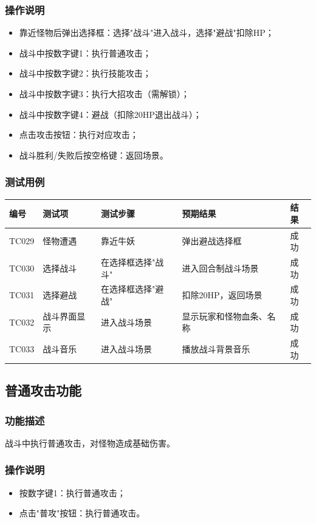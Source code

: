 \documentclass[a4paper,12pt]{article}
\begin{document}
\subsubsection{操作说明}
\begin{itemize}[leftmargin=2em]
    \item 靠近怪物后弹出选择框：选择"战斗"进入战斗，选择"避战"扣除HP；
    \item 战斗中按数字键1：执行普通攻击；
    \item 战斗中按数字键2：执行技能攻击；
    \item 战斗中按数字键3：执行大招攻击（需解锁）；
    \item 战斗中按数字键4：避战（扣除20HP退出战斗）；
    \item 点击攻击按钮：执行对应攻击；
    \item 战斗胜利/失败后按空格键：返回场景。
\end{itemize}

\subsubsection{测试用例}
\begin{longtable}{p{1.2cm} p{2.8cm} p{4cm} p{3.5cm} p{1.5cm}}
\toprule
\textbf{编号} & \textbf{测试项} & \textbf{测试步骤} & \textbf{预期结果} & \textbf{结果} \\
\midrule
\endhead
TC029 & 怪物遭遇 & 靠近牛妖 & 弹出避战选择框 & 成功 \\
TC030 & 选择战斗 & 在选择框选择"战斗" & 进入回合制战斗场景 & 成功 \\
TC031 & 选择避战 & 在选择框选择"避战" & 扣除20HP，返回场景 & 成功 \\
TC032 & 战斗界面显示 & 进入战斗场景 & 显示玩家和怪物血条、名称 & 成功 \\
TC033 & 战斗音乐 & 进入战斗场景 & 播放战斗背景音乐 & 成功 \\
\bottomrule
\end{longtable}

\subsection{普通攻击功能}

\subsubsection{功能描述}
战斗中执行普通攻击，对怪物造成基础伤害。

\subsubsection{操作说明}
\begin{itemize}[leftmargin=2em]
    \item 按数字键1：执行普通攻击；
    \item 点击"普攻"按钮：执行普通攻击。
\end{itemize}
\end{document}
